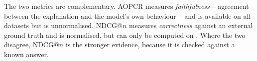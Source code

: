 The two metrics are complementary. AOPCR measures \emph{faithfulness} -- agreement between the
explanation and the model's own behaviour -- and is available on all datasets but is unnormalised.
NDCG@$n$ measures \emph{correctness} against an external ground truth and is normalised, but can
only be computed on \webtraffic{}. Where the two disagree, NDCG@$n$ is the stronger evidence,
because it is checked against a known answer.
